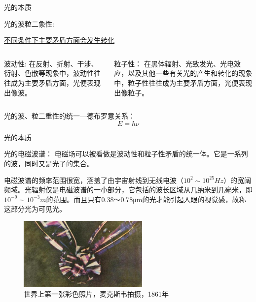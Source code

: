 \documentclass[trans]{beamer} %
\begin{document}
\begin{frame}[fragile]{光的本质}

\alert{光的波粒二象性:}
\begin{center}
    \underline{不同条件下主要矛盾方面会发生转化}
\end{center}
\begin{columns}
        \begin{column}{0.5\textwidth}
        
        \begin{exampleblock}{波动性:}
        在反射、折射、干涉、衍射、色散等现象中，波动性往往成为主要矛盾方面，光便表现出像波。
      \end{exampleblock}
        \end{column}
        \begin{column}{0.5\textwidth}
        \begin{exampleblock}{粒子性：}
       在黑体辐射、光致发光、光电效应，以及其他一些有关光的产生和转化的现象中，粒子性往往成为主要矛盾方面，光便表现出像粒子。

      \end{exampleblock}
        
        \end{column}
        \end{columns}
        光的波、粒二重性的统一---德布罗意关系：
        \begin{equation}  \label{eq:db}
        E=h\nu
        \end{equation}
    
\end{frame}


\begin{frame}[fragile]{光的本质}
\begin{alertblock}{光的电磁波谱：}
电磁场可以被看做是波动性和粒子性矛盾的统一体。它是一系列的波，同时又是光子的集合。		 

电磁波谱的频率范围很宽，涵盖了由宇宙射线到无线电波（$10^2\sim10^{25}Hz$）的宽阔频域。光辐射仅是电磁波谱的一小部分，它包括的波长区域从几纳米到几毫米，即$10^{-9}\sim10^{-3}m$的范围。而且只有0.38～0.78μm的光才能引起人眼的视觉感，故称这部分光为可见光。
  
	\end{alertblock}
    \begin{figure}[htbp]
      \includegraphics[width=2.5in]{source/ch2/fg201mx.jpg}
      \caption{世界上第一张彩色照片，麦克斯韦拍摄，1861年}%
  \end{figure}
\end{frame}
\end{document}
